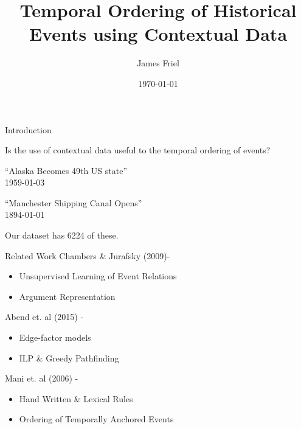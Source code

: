 \documentclass{beamer}
\author{James Friel}
\title{Temporal Ordering of Historical
Events using Contextual Data}
\date{\today}
\begin{document}
\titlepageframe

\begin{tframe}{Introduction}
  \begin{center}

    Is the use of contextual data useful to the temporal ordering of events?\vspace{1em}


    ``Alaska Becomes 49th US state''\\1959-01-03\vspace{1em}

    ``Manchester Shipping Canal Opens''\\1894-01-01\vspace{4em}
\end{center}
   Our dataset has 6224 of these.
\end{tframe}

\begin{tframe}{Related Work}
  Chambers \& Jurafsky (2009)-
  \begin{itemize}
    \item Unsupervised Learning of Event Relations
    \item Argument Representation
  \end{itemize}
  
  Abend et. al (2015) -
  \begin{itemize}
    \item Edge-factor models
    \item ILP \& Greedy Pathfinding
  \end{itemize}
  
  Mani et. al (2006) - 
  \begin{itemize}
    \item Hand Written \& Lexical Rules
    \item Ordering of Temporally Anchored Events
  \end{itemize}
  
\end{tframe}
\end{document}
